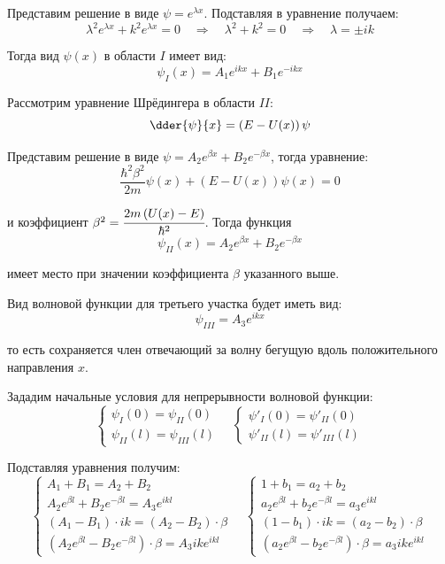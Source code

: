 Представим решение в виде \( \psi = e^{\lambda x} \). Подставляя в уравнение 
получаем:
\[ 
	\lambda^2 e^{\lambda x} + k^2 e^{\lambda x} = 0 \quad\Rightarrow\quad
	\lambda^2 + k^2 = 0 \quad\Rightarrow\quad \lambda = \pm ik 
\]

Тогда вид \( \psi(x) \) в области \( I \) имеет вид:
\[
	\psi_{I}(x) = A_1 e^{ikx} + B_1 e^{-ikx}
\]

Рассмотрим уравнение Шрёдингера в области \( II \):
\[
	\dder{\psi}{x} = \left( E - U(x) \right)\psi
\]

Представим решение в виде \( \psi = A_2 e^{\beta x} + B_2 e^{-\beta x} \), 
тогда уравнение:
\[
	\frac{\hbar^2 \beta^2}{2m}\psi(x) + \left( E - U(x) \right)\psi(x) = 0
\]

и коэффициент \( \beta^2 = \cfrac{2m\left( U(x) - E\right)}{\hbar^2} \). 
Тогда функция 
\[
	\psi_{II}(x) = A_2 e^{\beta x} + B_2 e^{-\beta x}
\]

имеет место при значении коэффициента \( \beta \) указанного выше.

Вид волновой функции для третьего участка будет иметь вид:
\[
	\psi_{III} = A_3 e^{ikx}
\]

то есть сохраняется член отвечающий за волну бегущую вдоль
положительного направления \( x \).

Зададим начальные условия для непрерывности волновой функции:
\[
	\left\{ \begin{array}{ll}
		\psi_{I}(0) = \psi_{II}(0) \\
		\psi_{II}(l) = \psi_{III}(l)
	\end{array} \right. \quad
	\left\{ \begin{array}{ll}
		\psi'_{I}(0) = \psi'_{II}(0) \\
		\psi'_{II}(l) = \psi'_{III}(l)
	\end{array} \right.
\]

Подставляя уравнения получим:
\[
	\left\{ \begin{array}{ll}
		A_1 + B_1 = A_2 + B_2 \\
		A_2 e^{\beta l} + B_2 e^{-\beta l} = A_3 e^{ikl} \\
		\left( A_1 - B_1 \right) \cdot ik = 
			\left( A_2 - B_2 \right) \cdot \beta \\
		\left( A_2 e^{\beta l} - B_2 e^{-\beta l} \right) \cdot \beta = 
			A_3 ik e^{ikl}
	\end{array} \right. \quad
	\left\{ \begin{array}{ll}
		1 + b_1 = a_2 + b_2 \\
		a_2 e^{\beta l} + b_2 e^{-\beta l} = a_3 e^{ikl} \\
		\left( 1 - b_1 \right) \cdot ik = 
			\left( a_2 - b_2 \right) \cdot \beta \\
		\left( a_2 e^{\beta l} - b_2 e^{-\beta l} \right) \cdot \beta = 
			a_3 ik e^{ikl}
	\end{array} \right.
\]

